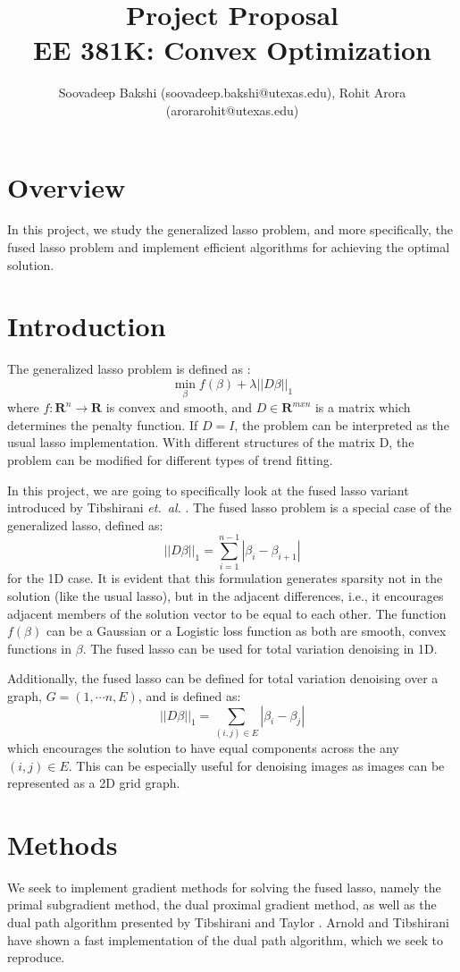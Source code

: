 \documentclass[a4paper]{article}
\title{Project Proposal \\ EE 381K: Convex Optimization }
\author{Soovadeep Bakshi (soovadeep.bakshi@utexas.edu), Rohit Arora (arorarohit@utexas.edu)}
\begin{document}
\maketitle


\section{Overview}

In this project, we study the generalized lasso problem, and more specifically, the fused lasso problem and implement efficient algorithms for achieving the optimal solution.

\section{Introduction}

The generalized lasso problem is defined as \cite{Tibs16}:
\[\min_{\beta} f(\beta) + \lambda ||D \beta ||_1 \]
where $ f: \mathbf{R}^n \rightarrow \mathbf{R} $ is convex and smooth, and $D \in \mathbf{R}^{mxn}$ is a matrix which determines the penalty function. If $D = I$, the problem can be interpreted as the usual lasso implementation. With different structures of the matrix D, the problem can be modified for different types of trend fitting.

In this project, we are going to specifically look at the fused lasso variant introduced by Tibshirani \textit{et.\ al.} \cite{Tibs05}. The fused lasso problem is a special case of the generalized lasso, defined as: 
\[||D\beta||_1 = \sum ^{n-1} _{i = 1} |\beta_i - \beta_{i+1}|\]
for the 1D case. It is evident that this formulation generates sparsity not in the solution (like the usual lasso), but in the adjacent differences, i.e., it encourages adjacent members of the solution vector to be equal to each other. The function $f(\beta)$ can be a Gaussian or a Logistic loss function as both are smooth, convex functions in $\beta$. The fused lasso can be used for total variation denoising in 1D.

Additionally, the fused lasso can be defined for total variation denoising over a graph, $G = ({1,\cdots n}, E)$, and is defined as:
\[||D\beta||_1 = \sum _{(i,j) \in E} |\beta_i - \beta_{j}|\]
which encourages the solution to have equal components across the any $(i,j) \in E$. This can be especially useful for denoising images as images can be represented as a 2D grid graph.

\section{Methods}

We seek to implement gradient methods for solving the fused lasso, namely the primal subgradient method, the dual proximal gradient method, as well as the dual path algorithm presented by Tibshirani and Taylor \cite{Tibs11}. Arnold and Tibshirani \cite{Tibs16} have shown a fast implementation of the dual path algorithm, which we seek to reproduce.



\end{document}
